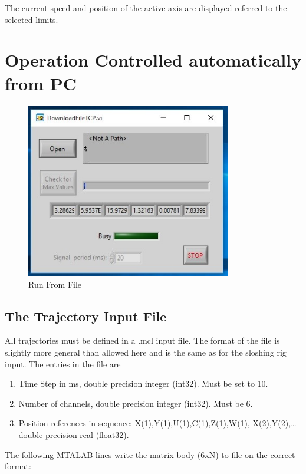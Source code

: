 \documentclass[a4paper,twoside,english]{report}
\begin{document}
The current speed and position of the active axis are displayed referred
to the selected limits.

\newpage{}

\section{Operation Controlled automatically from PC}

\begin{figure}
\centering \includegraphics[width=0.8\textwidth]{fig/towing_runfromfile}
\caption{\label{fig: Towing main-1}Run From File}
\end{figure}


\subsection{The Trajectory Input File}

All trajectories must be defined in a .mcl input file. The format
of the file is slightly more general than allowed here and is the
same as for the sloshing rig input. The entries in the file are
\begin{enumerate}
\item Time Step in ms, double precision integer (int32). Must be set to
10.
\item Number of channels, double precision integer (int32). Must be 6.
\item Position references in sequence: X(1),Y(1),U(1),C(1),Z(1),W(1), X(2),Y(2),…
double precision real (float32).
\end{enumerate}
The following MTALAB lines write the matrix body (6xN) to file on
the correct format:
\end{document}
